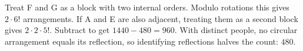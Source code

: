 Treat F and G as a block with two internal orders. Modulo rotations this gives $2\cdot6!$ arrangements. If A and E are also adjacent, treating them as a second block gives $2\cdot2\cdot5!$. Subtract to get $1440-480=960$. With distinct people, no circular arrangement equals its reflection, so identifying reflections halves the count: $\boxed{480}$.

